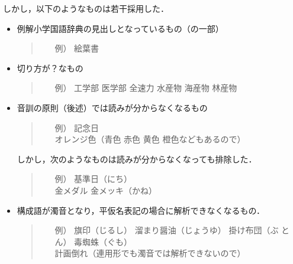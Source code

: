 \documentclass[a4j,titlepage]{jarticle}
\begin{document}
しかし，以下のようなものは若干採用した．

\begin{itemize}
 \item 例解小学国語辞典の見出しとなっているもの（の一部）
       \begin{quote}
	\begin{itemize}
	 \item[例）] 絵葉書
	\end{itemize}
       \end{quote}

 \item 切り方が？なもの
       \begin{quote}
	\begin{itemize}
	 \item[例）] 工学部 医学部 全速力 水産物 海産物 林産物
	\end{itemize}
       \end{quote}

 \item 音訓の原則（後述）では読みが分からなくなるもの
       \begin{quote}
	\begin{itemize}
	 \item[例）] 記念日 \\
		   オレンジ色（青色 赤色 黄色 橙色などもあるので）
	\end{itemize}
       \end{quote}

  しかし，次のようなものは読みが分からなくなっても排除した．
       \begin{quote}
	\begin{itemize}
	 \item[例）] 基準日（にち） \\
		   金メダル 金メッキ（かね）
	\end{itemize}
       \end{quote}

 \item 構成語が濁音となり，平仮名表記の場合に解析できなくなるもの．
       \begin{quote}
	\begin{itemize}
	 \item[例）] 旗印（じるし） 溜まり醤油（じょうゆ） 掛け布団（ぶ
		   とん） 毒蜘蛛（ぐも）\\
		   計画倒れ（連用形でも濁音では解析できないので）
	\end{itemize}
       \end{quote}


\end{itemize}
\end{document}
